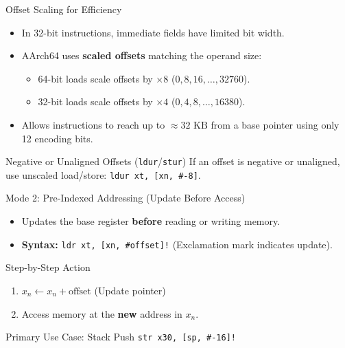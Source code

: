\documentclass[aspectratio=169,11pt,t]{beamer}
\newcommand{\key}[1]{\textbf{#1}}
\newcommand{\code}[1]{\texttt{#1}}
\begin{document}
\begin{frame}{Offset Scaling for Efficiency}
\large
\begin{itemize}\setlength{\itemsep}{6pt}
  \item In 32-bit instructions, immediate fields have limited bit width.
  \item AArch64 uses \key{scaled offsets} matching the operand size:
  \begin{itemize}\setlength{\itemsep}{3pt}
    \item 64-bit loads scale offsets by $\times 8$ ($0, 8, 16, \dots, 32760$).
    \item 32-bit loads scale offsets by $\times 4$ ($0, 4, 8, \dots, 16380$).
  \end{itemize}
  \item Allows instructions to reach up to $\approx 32\text{ KB}$ from a base pointer using only 12 encoding bits.
\end{itemize}

\vspace{0.25cm}
\begin{block}{Negative or Unaligned Offsets (\texttt{ldur}/\texttt{stur})}
If an offset is negative or unaligned, use unscaled load/store: \code{ldur xt, [xn, \#-8]}.
\end{block}
\end{frame}


\begin{frame}{Mode 2: Pre-Indexed Addressing (Update Before Access)}

\begin{itemize}\setlength{\itemsep}{5pt}
  \item Updates the base register \key{before} reading or writing memory.
  \item \key{Syntax:} \code{ldr xt, [xn, \#offset]!} \quad (Exclamation mark indicates update).
\end{itemize}

\vspace{0.2cm}
\begin{block}{Step-by-Step Action}
\begin{enumerate}\setlength{\itemsep}{3pt}
  \item $x_n \leftarrow x_n + \text{offset}$ \quad (Update pointer)
  \item Access memory at the \key{new} address in $x_n$.
\end{enumerate}
\end{block}

\vspace{0.25cm}
\begin{block}{Primary Use Case: Stack Push}
\code{str x30, [sp, \#-16]!} \\
\end{block}
\end{frame}
\end{document}
